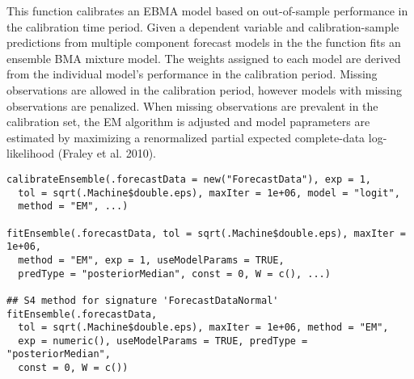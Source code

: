 \documentclass[a4paper]{book}
\begin{document}
\begin{Description}\relax
This function calibrates an EBMA model based on out-of-sample performance in the calibration time period. Given a dependent variable and calibration-sample predictions from multiple component forecast models in the  the  function fits an ensemble BMA mixture model. The weights assigned to each model are derived from the individual model's performance in the calibration period. Missing observations are allowed in the calibration period, however models with missing observations are penalized. When missing observations are prevalent in the calibration set, the EM algorithm is adjusted and model paprameters are estimated by maximizing a renormalized partial expected complete-data log-likelihood (Fraley et al. 2010).
\end{Description}
%
\begin{Usage}
\begin{verbatim}
calibrateEnsemble(.forecastData = new("ForecastData"), exp = 1,
  tol = sqrt(.Machine$double.eps), maxIter = 1e+06, model = "logit",
  method = "EM", ...)

fitEnsemble(.forecastData, tol = sqrt(.Machine$double.eps), maxIter = 1e+06,
  method = "EM", exp = 1, useModelParams = TRUE,
  predType = "posteriorMedian", const = 0, W = c(), ...)

## S4 method for signature 'ForecastDataNormal'
fitEnsemble(.forecastData,
  tol = sqrt(.Machine$double.eps), maxIter = 1e+06, method = "EM",
  exp = numeric(), useModelParams = TRUE, predType = "posteriorMedian",
  const = 0, W = c())
\end{verbatim}
\end{Usage}
%
\end{document}
